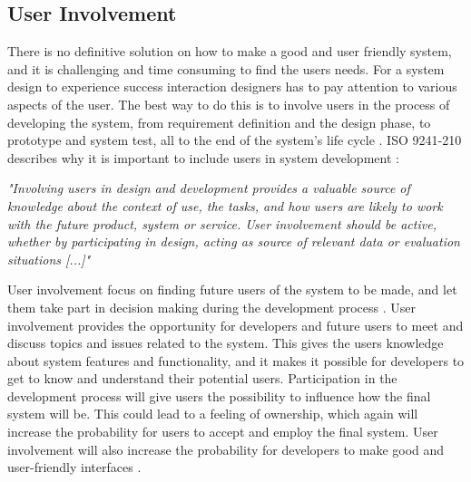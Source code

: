 \subsection{User Involvement}
There is no definitive solution on how to make a good and user friendly system, and it is challenging and time consuming to find the users needs. For a system design to experience success interaction designers has to pay attention to various aspects of the user. The best way to do this is to involve users in the process of developing the system, from requirement definition and the design phase, to prototype and system test, all to the end of the system's life cycle \cite{mmi}. ISO 9241-210 describes why it is important to include users in system development \cite{dis20109241}:

\emph{"Involving users in design and development provides a valuable source of knowledge about the context of use, the tasks, and how users are likely to work with the future product, system or service. User involvement should be active, whether by participating in design, acting as source of relevant data or evaluation situations [...]"}

User involvement focus on finding future users of the system to be made, and let them take part in decision making during the development process \cite{bjerknes1995user}. User involvement provides the opportunity for developers and future users to meet and discuss topics and issues related to the system. This gives the users knowledge about system features and functionality, and it makes it possible for developers to get to know and understand their potential users. Participation in the development process will give users the possibility to influence how the final system will be. This could lead to a feeling of ownership, which again will increase the probability for users to accept and employ the final system. User involvement will also increase the probability for developers to make good and user-friendly interfaces \cite{infodesign} \cite{mmi}. 


